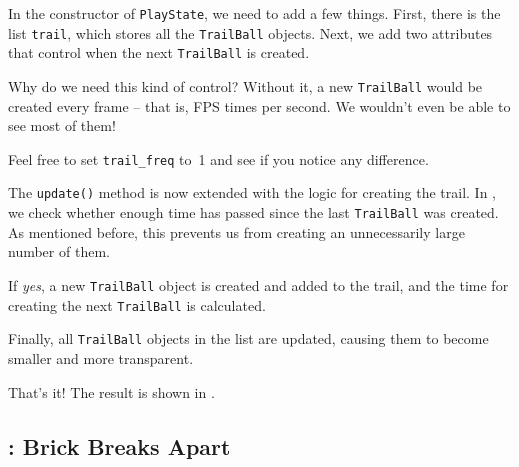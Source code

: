 
In the constructor of \texttt{PlayState}, we need to add a few things. First, there is the list \texttt{trail}, which stores all the \texttt{TrailBall} objects. Next, we add two attributes that control when the next \texttt{TrailBall} is created.

Why do we need this kind of control? Without it, a new \texttt{TrailBall} would be created every frame -- that is, FPS times per second. We wouldn't even be able to see most of them!

Feel free to set \texttt{trail\_freq} to~1 and see if you notice any difference.


\begin{figure}%
	\begin{center}%
		\vspace{-6ex}%
	\end{center}%
\end{figure}%
The \texttt{update()} method is now extended with the logic for creating the trail. In , we check whether enough time has passed since the last \texttt{TrailBall} was created. As mentioned before, this prevents us from creating an unnecessarily large number of them.

If \emph{yes}, a new \texttt{TrailBall} object is created and added to the trail, and the time for creating the next \texttt{TrailBall} is calculated.

Finally, all \texttt{TrailBall} objects in the list are updated, causing them to become smaller and more transparent.

That's it! The result is shown in .


\newpage
\subsection{: Brick Breaks Apart}

